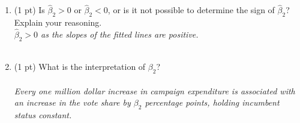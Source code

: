 \documentclass{./../../Latex/tests}
\begin{document}
\begin{enumerate}
\begin{enumerate}
  \item (1 pt) Is $\hat{\beta}_2>0$ or $\hat{\beta}_2<0$, or is it not possible to determine the sign of $\hat{\beta}_2$? Explain your reasoning. \\
  
\textit{  $\hat{\beta}_2>0$ as the slopes of the fitted lines are positive.} \\~\\
  
  \item (1 pt) What is the interpretation of $\beta_2$? \\~\\
 \textit{ Every one million dollar increase in campaign expenditure is associated with an increase in the vote share by $\beta_2$ percentage points, holding incumbent status constant.}
\end{enumerate}


\end{enumerate}
\end{document}
